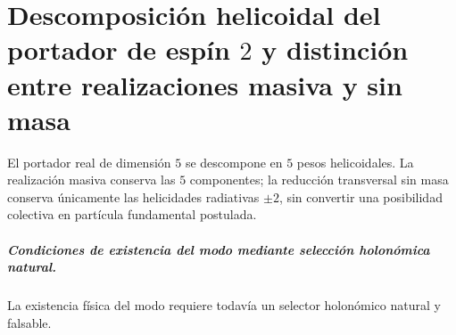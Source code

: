 \chapter{Descomposición helicoidal del portador de espín \texorpdfstring{\(2\)}{2} y distinción entre realizaciones masiva y sin masa}
\label{chap:parte-iv-65}

El portador real de dimensión \(5\) se descompone en \(5\) pesos helicoidales. La realización masiva conserva las \(5\) componentes; la reducción transversal sin masa conserva únicamente las helicidades radiativas \(\pm2\), sin convertir una posibilidad colectiva en partícula fundamental postulada.



\paragraph{Condiciones de existencia del modo mediante selección holonómica natural.} La existencia física del modo requiere todavía un selector holonómico natural y falsable.
